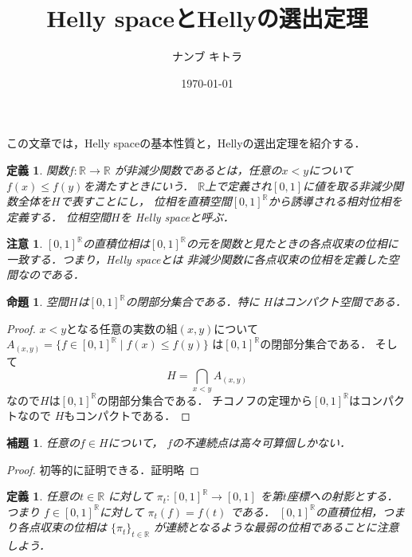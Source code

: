 \documentclass[leqno, 12pt]{jsarticle}
\title{Helly spaceとHellyの選出定理}
\author{ナンブ キトラ}
\date{\today}
\newtheorem{prop}[thm]{命題}
\newtheorem{lem}[thm]{補題}
\newtheorem{df}[thm]{定義}
\newtheorem*{rmk}{注意}
\newcommand{\rr}{\mathbb{R}}
\begin{document}
\maketitle

この文章では，Helly spaceの基本性質と，Hellyの選出定理を紹介する．

\begin{df}
関数$f: \rr\to\rr$
が非減少関数であるとは，任意の$x<y$について
$f(x)\le f(y)$を満たすときにいう．
$\rr$上で定義され$[0, 1]$に値を取る非減少関数全体を$H$で表すことにし，
位相を直積空間$[0, 1]^{\rr}$から誘導される相対位相を定義する．
位相空間$H$を
\emph{Helly space}と呼ぶ．
\end{df}

\begin{rmk}
$[0, 1]^{\rr}$の直積位相は$[0, 1]^{\rr}$の元を関数と見たときの各点収束の位相に一致する．つまり，Helly spaceとは
非減少関数に各点収束の位相を定義した空間なのである．
\end{rmk}

\begin{prop}
空間$H$は$[0, 1]^{\rr}$の閉部分集合である．特に
$H$はコンパクト空間である．
\end{prop}
\begin{proof}
$x<y$となる任意の実数の組$(x, y)$について
$A_{(x, y)}=\{f\in [0, 1]^{\rr}\mid f(x)\le f(y)\}$
は$[0, 1]^\rr$の閉部分集合である．
そして
\[
H=\bigcap_{x<y}A_{(x, y)}
\]
なので$H$は$[0, 1]^{\rr}$の閉部分集合である．
チコノフの定理から$[0, 1]^{\rr}$はコンパクトなので
$H$もコンパクトである．
\end{proof}

\begin{lem}
任意の$f\in H$について，
$f$の不連続点は高々可算個しかない．
\end{lem}
\begin{proof}
初等的に証明できる．証明略
\end{proof}

\begin{df}
任意の$t\in \rr$
に対して
$\pi_t: [0, 1]^{\rr}\to [0, 1]$
を第$t$座標への射影とする．
つまり
$f\in [0, 1]^{\rr}$に対して
$\pi_t(f)=f(t)$
である．
$[0, 1]^{\rr}$の直積位相，つまり各点収束の位相は
$\{\pi_t\}_{t\in \rr}$
が連続となるような最弱の位相であることに注意しよう．
\end{df}
\end{document}
